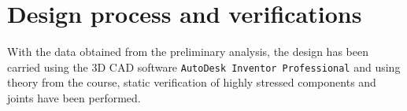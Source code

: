 \section{Design process and verifications}
	With the data obtained from the preliminary analysis, the design has been carried using the 3D CAD software \texttt{AutoDesk Inventor Professional} and using theory from the course, static verification of highly stressed components and joints have been performed.